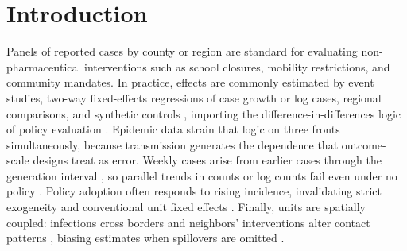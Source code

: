 \section{Introduction}
\label{s:intro}

Panels of reported cases by county or region are standard for evaluating non-pharmaceutical
interventions such as school closures, mobility restrictions, and community mandates. In practice,
effects are commonly estimated by event studies, two-way fixed-effects regressions of case growth
or log cases, regional comparisons, and synthetic controls
\citep{hsiang2020anticontagion,chernozhukov2021masks,mitze2020masks}, importing the
difference-in-differences logic of policy evaluation
\citep{callaway2021did,roth2023trending,haber2021impact}. Epidemic data strain that logic on
three fronts simultaneously, because transmission generates the dependence that outcome-scale
designs treat as error. Weekly cases arise from earlier cases through the generation interval
\citep{wallinga2004different,fraser2007estimating,wallinga2007generation}, so parallel trends in
counts or log counts fail even under no policy \citep{gauthier2021twfe,feng2024parallel}. Policy
adoption often responds to rising incidence, invalidating strict exogeneity and conventional unit
fixed effects \citep{imai2019fixed,zhang2025timevarying}. Finally, units are spatially coupled:
infections cross borders and neighbors' interventions alter contact patterns
\citep{halloran1995causal,hudgens2008interference,ogburn2014causal,halloran2016dependent,aronow2017exposure,cai2021contagion},
biasing estimates when spillovers are omitted \citep{zhao2021interdependent,enriquez2025spillovers}.

